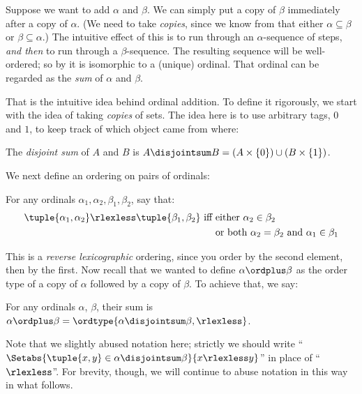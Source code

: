 \documentclass[../../../include/open-logic-section]{subfiles}
\begin{document}

Suppose we want to add $\alpha$ and $\beta$. We can simply put a
{copy} of $\beta$ immediately after a copy of $\alpha$. (We need to
take \emph{copies}, since we know from
 that either $\alpha
\subseteq \beta$ or $\beta \subseteq \alpha$.) The intuitive effect of
this is to run through an $\alpha$-sequence of steps, \emph{and then}
to run through a $\beta$-sequence. The resulting sequence will be
well-ordered; so by
 it is isomorphic
to a (unique) ordinal. That ordinal can be regarded as the \emph{sum}
of $\alpha$ and $\beta$. 

That is the intuitive idea behind ordinal addition. To define it
rigorously, we start with the idea of taking \emph{copies} of sets.
The idea here is to use arbitrary tags, $0$ and $1$, to keep track of
which object came from where:

\begin{defn}
The \emph{disjoint sum} of $A$ and $B$ is $A \disjointsum B = (A\times
\{0\}) \cup (B \times \{1\})$.
\end{defn}

We next define an ordering on pairs of ordinals:

\begin{defn}
For any ordinals $\alpha_1, \alpha_2, \beta_1, \beta_2$, say that:
\begin{align*}
	\tuple{\alpha_1, \alpha_2} \rlexless \tuple{\beta_1, \beta_2}\text{ iff }& 
	\text{either $\alpha_2 \in \beta_2$}\\
	& \text{or both $\alpha_2 = \beta_2$ and $\alpha_1 \in \beta_1$}
\end{align*} 
\end{defn}

This is a \emph{reverse lexicographic} ordering, since you order by
the second element, then by the first. Now recall that we wanted to
define $\alpha \ordplus \beta$ as the order type of a copy of $\alpha$
followed by a copy of $\beta$. To achieve that, we say:

\begin{defn}
For any ordinals $\alpha$, $\beta$, their sum is $\alpha \ordplus
\beta = \ordtype{\alpha \disjointsum \beta, \rlexless}$.
\end{defn}
\noindent
Note that we slightly abused notation here; strictly we should write ``$\Setabs{\tuple{x,y}\in \alpha\disjointsum\beta}{x \rlexless y}$'' in place of ``$\rlexless$''. For brevity, though, we will continue to abuse notation in this way in what follows. 
\end{document}
